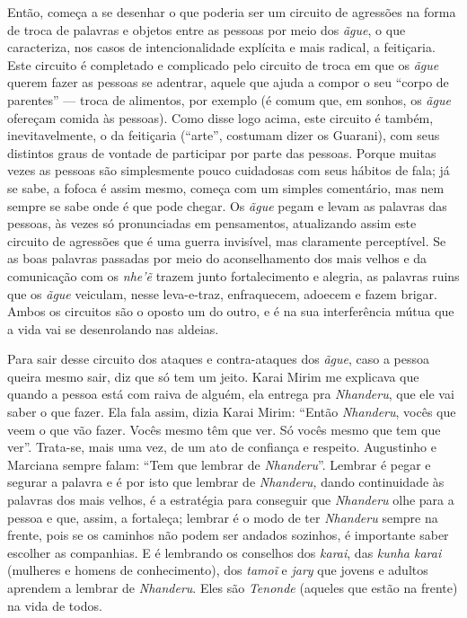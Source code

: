 Então, começa a se desenhar o que poderia ser um circuito de agressões
na forma de troca de palavras e objetos entre as pessoas por meio dos
\emph{ãgue}, o que caracteriza, nos casos de intencionalidade explícita
e mais radical, a feitiçaria. Este circuito é completado e complicado
pelo circuito de troca em que os \emph{ãgue} querem fazer as pessoas se
adentrar, aquele que ajuda a compor o seu ``corpo de parentes'' ---
troca de alimentos, por exemplo (é comum que, em sonhos, os \emph{ãgue}
ofereçam comida às pessoas). Como disse logo acima, este circuito é
também, inevitavelmente, o da feitiçaria (``arte'', costumam dizer os
Guarani), com seus distintos graus de vontade de participar por parte
das pessoas. Porque muitas vezes as pessoas são simplesmente pouco
cuidadosas com seus hábitos de fala; já se sabe, a fofoca é assim mesmo,
começa com um simples comentário, mas nem sempre se sabe onde é que pode
chegar. Os \emph{ãgue} pegam e levam as palavras das pessoas, às vezes
só pronunciadas em pensamentos, atualizando assim este circuito de
agressões que é uma guerra invisível, mas claramente perceptível. Se as
boas palavras passadas por meio do aconselhamento dos mais velhos e da
comunicação com os \emph{nhe'ẽ} trazem junto fortalecimento e alegria,
as palavras ruins que os \emph{ãgue} veiculam, nesse leva-e-traz,
enfraquecem, adoecem e fazem brigar. Ambos os circuitos são o oposto um
do outro, e é na sua interferência mútua que a vida vai se desenrolando
nas aldeias.

Para sair desse circuito dos ataques e contra-ataques dos \emph{ãgue},
caso a pessoa queira mesmo sair, diz que só tem um jeito. Karai Mirim me
explicava que quando a pessoa está com raiva de alguém, ela entrega pra
\emph{Nhanderu}, que ele vai saber o que fazer. Ela fala assim, dizia
Karai Mirim: ``Então \emph{Nhanderu}, vocês que veem o que vão fazer.
Vocês mesmo têm que ver. Só vocês mesmo que tem que ver''. Trata-se,
mais uma vez, de um ato de confiança e respeito. Augustinho e Marciana
sempre falam: ``Tem que lembrar de \emph{Nhanderu}''. Lembrar é pegar e
segurar a palavra e é por isto que lembrar de \emph{Nhanderu,} dando
continuidade às palavras dos mais velhos, é a estratégia para conseguir
que \emph{Nhanderu} olhe para a pessoa e que, assim, a fortaleça;
lembrar é o modo de ter \emph{Nhanderu} sempre na frente, pois se os
caminhos não podem ser andados sozinhos, é importante saber escolher as
companhias. E é lembrando os conselhos dos \emph{karai}, das \emph{kunha
karai} (mulheres e homens de conhecimento), dos \emph{tamoĩ} e
\emph{jary} que jovens e adultos aprendem a lembrar de \emph{Nhanderu}.
Eles são \emph{Tenonde} (aqueles que estão na frente) na vida de todos.

